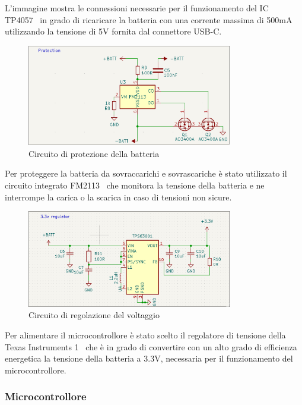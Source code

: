 L'immagine mostra le connessioni necessarie per il funzionamento del IC TP4057~\cite{charger_sheet} in grado di ricaricare la batteria con una corrente 
massima di 500mA utilizzando la tensione di 5V fornita dal connettore USB-C.

\begin{figure}[H]
  \centering
  \includegraphics[width=0.8\textwidth]{images/chapter2/protection.png}
  \caption{Circuito di protezione della batteria}
  \label{fig:protection}
\end{figure}

Per proteggere la batteria da sovraccarichi e sovrascariche è stato utilizzato il circuito integrato FM2113~\cite{protection_sheet} che
monitora la tensione della batteria e ne interrompe la carica o la scarica in caso di tensioni non sicure.

\begin{figure}[H]
  \centering
  \includegraphics[width=0.8\textwidth]{images/chapter2/regulator.png}
  \caption{Circuito di regolazione del voltaggio}
  \label{fig:regulator}
\end{figure}

Per alimentare il microcontrollore è stato scelto il regolatore di tensione della Texas Instruments 1~\cite{regulator_sheet} 
che è in grado di convertire con un alto grado di efficienza energetica la tensione della batteria a 3.3V, necessaria per il funzionamento del microcontrollore.

\subsubsection{Microcontrollore}

